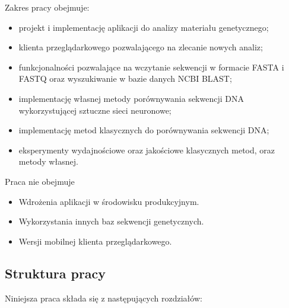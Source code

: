         Zakres pracy obejmuje:
        \begin{itemize}
            \item {
                projekt i implementację aplikacji do analizy materiału genetycznego;
            }
            \item {
                klienta przeglądarkowego pozwalającego na zlecanie nowych analiz;
            }
            \item {
                funkcjonalności pozwalające na wczytanie sekwencji w formacie FASTA i FASTQ oraz wyszukiwanie w bazie danych NCBI BLAST;
            }
            \item {
                implementację własnej metody porównywania sekwencji DNA wykorzystującej sztuczne sieci neuronowe;
            }
            \item {
                implementację metod klasycznych do porównywania sekwencji DNA;
            }
            \item {
                eksperymenty wydajnościowe oraz jakościowe klasycznych metod, oraz metody własnej.
            }
        \end{itemize}

        Praca nie obejmuje
        \begin{itemize}
            \item {
                Wdrożenia aplikacji w środowisku produkcyjnym.
            }
            \item {
                Wykorzystania innych baz sekwencji genetycznych.
            }
            \item {
                Wersji mobilnej klienta przeglądarkowego.
            }
        \end{itemize}

    \subsection {Struktura pracy}

    Niniejsza praca składa się z następujących rozdziałów:

